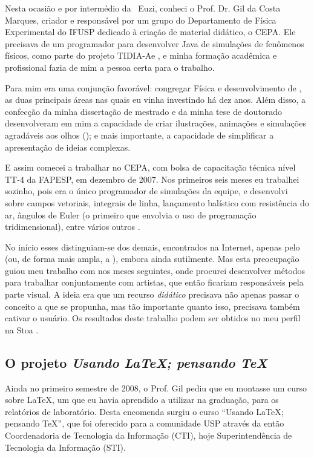 Nesta ocasião e por intermédio da \profa\ Euzi, conheci o Prof. Dr. Gil da Costa Marques, criador e responsável por um grupo do Departamento de Física Experimental do IFUSP dedicado à criação de material didático, o CEPA. Ele precisava de um programador para desenvolver  Java de simulações de fenômenos físicos, como parte do projeto TIDIA-Ae \cite{tidia}, e minha formação acadêmica e profissional fazia de mim a pessoa certa para o trabalho.

Para mim era uma conjunção favorável: congregar Física e desenvolvimento de , as duas principais áreas nas quais eu vinha investindo há dez anos. Além disso, a confecção da minha dissertação de mestrado e da minha tese de doutorado desenvolveram em mim a capacidade de criar ilustrações, animações e simulações agradáveis aos olhos (); e mais importante, a capacidade de simplificar a apresentação de ideias complexas.

E assim comecei a trabalhar no CEPA, com bolsa de capacitação técnica nível TT-4 da FAPESP, em dezembro de 2007. Nos primeiros seis meses eu trabalhei sozinho, pois era o único programador de simulações da equipe, e desenvolvi  sobre campos vetoriais, integrais de linha, lançamento balístico com resistência do ar, ângulos de Euler (o primeiro que envolvia o uso de programação tridimensional), entre vários outros \cite{applets}.

No início esses  distinguiam-se dos demais, encontrados na Internet, apenas pelo  (ou, de forma mais ampla, a ), embora ainda sutilmente. Mas esta preocupação guiou meu trabalho com  nos meses seguintes, onde procurei desenvolver métodos para trabalhar conjuntamente com artistas, que então ficariam responsáveis pela parte visual. A ideia era que um recurso \emph{didático} precisava não apenas passar o conceito a que se propunha, mas tão importante quanto isso, precisava também cativar o usuário. Os resultados deste trabalho podem ser obtidos no meu perfil na  Stoa \cite{irpagnossin-stoa}.

\subsection{O projeto \textsl{Usando \LaTeX; pensando \TeX}}
\label{sec:latex}

Ainda no primeiro semestre de 2008, o Prof. Gil pediu que eu montasse um curso sobre \LaTeX, um  que eu havia aprendido a utilizar na graduação, para os relatórios de laboratório. Desta encomenda surgiu o curso ``Usando \LaTeX; pensando \TeX'', que foi oferecido para a comunidade USP através da então Coordenadoria de Tecnologia da Informação (CTI), hoje Superintendência de Tecnologia da Informação (STI).

